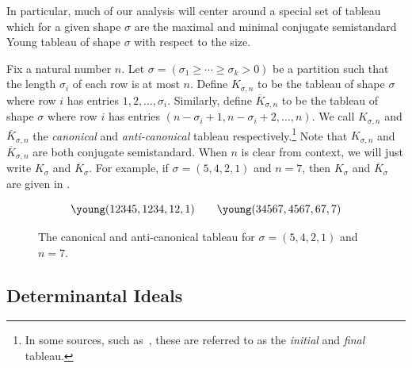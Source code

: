 \documentclass[letterpaper, 11pt]{amsart}
\begin{document}
In particular, much of our analysis will center around a special set of tableau which for a given shape $\sigma$ are the maximal and minimal conjugate semistandard Young tableau of shape $\sigma$ with respect to the size.
\begin{defn}\label{defn:canonical_tableau}
    Fix a natural number $n$.
    Let $\sigma = (\sigma_1 \geq \cdots \geq \sigma_k > 0)$ be a partition such that the length $\sigma_i$ of each row is at most $n$.
    Define $K_{\sigma, n}$ to be the tableau of shape $\sigma$ where row $i$ has entries $1, 2, \ldots, \sigma_i$.
    Similarly, define $\overline{K}_{\sigma, n}$ to be the tableau of shape $\sigma$ where row $i$ has entries $(n - \sigma_i + 1, n - \sigma_i + 2, \ldots, n)$.
    We call $K_{\sigma, n}$ and $\overline{K}_{\sigma, n}$ the \emph{canonical} and \emph{anti-canonical} tableau respectively.\footnote{In some sources, such as~\cite{BV88}, these are referred to as the \emph{initial} and \emph{final} tableau.}
    Note that $K_{\sigma, n}$ and $\overline{K}_{\sigma, n}$ are both conjugate semistandard.
    When $n$ is clear from context, we will just write $K_{\sigma}$ and $\overline{K}_{\sigma}$.
    For example, if $\sigma = (5, 4, 2, 1)$ and $n = 7$, then $K_\sigma$ and $\overline{K}_\sigma$ are given in .
    
    \begin{figure}[H]
        \centering
        \[
            \young(12345,1234,12,1) \qquad \young(34567,4567,67,7)
        \]
        \caption{
          The canonical and anti-canonical tableau for $\sigma = (5, 4, 2, 1)$ and $n = 7$.
        }\label{fig:canonical_tableau_ex}
    \end{figure}
\end{defn}

\subsection{Determinantal Ideals}
\end{document}
